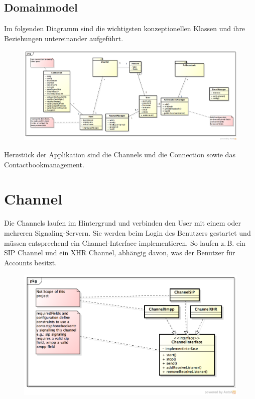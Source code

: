 \begin{landscape}
\section{Domainmodel}
	Im folgenden Diagramm sind die wichtigsten konzeptionellen Klassen und ihre Beziehungen untereinander aufgeführt.
	\begin{figure}[H]
		\centering
		\includegraphics[width=1.2\textwidth]{../architekturanalayse/img/domain.png}
	\end{figure}
	Herzstück der Applikation sind die Channels und die Connection sowie das Contactbookmanagement.

\end{landscape}

\section{Channel}
	Die Channels laufen im Hintergrund und verbinden den User mit einem oder
	mehreren Signaling-Servern. Sie werden beim Login des Benutzers gestartet und
	müssen entsprechend ein Channel-Interface implementieren. So laufen z.\,B. ein
	SIP Channel und ein XHR Channel, abhängig davon, was der Benutzer für Accounts
	besitzt.
	\begin{figure}[H]
		\centering
		\includegraphics[width=\textwidth]{../architekturanalayse/img/channel.png}
	\end{figure}
	
